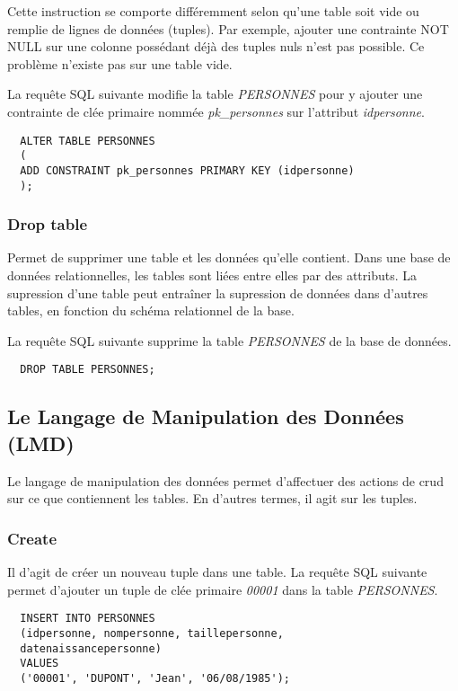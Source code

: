 Cette instruction se comporte différemment selon qu'une table soit vide ou remplie de lignes de données (\glspl{tuple}).
Par exemple, ajouter une contrainte NOT NULL sur une colonne possédant déjà des tuples nuls n'est pas possible. Ce problème n'existe pas sur une table vide.

La requête SQL suivante modifie la table \textit{PERSONNES} pour y ajouter une contrainte de clée primaire nommée \textit{pk\_personnes} sur l'attribut \textit{idpersonne}.

\begin{lstlisting}
  ALTER TABLE PERSONNES
  (
  ADD CONSTRAINT pk_personnes PRIMARY KEY (idpersonne)
  );
\end{lstlisting}

\subsubsection{Drop table}
Permet de supprimer une table et les données qu'elle contient.
Dans une base de données relationnelles, les tables sont liées entre elles par des attributs.
La supression d'une table peut entraîner la supression de données dans d'autres tables, en fonction du schéma relationnel de la base.

La requête SQL suivante supprime la table \textit{PERSONNES} de la base de données.
\begin{lstlisting}
  DROP TABLE PERSONNES;
\end{lstlisting}

\subsection{Le Langage de Manipulation des Données (LMD)}
Le langage de manipulation des données permet d'affectuer des actions de \gls{crud} sur ce que contiennent les tables.
En d'autres termes, il agit sur les tuples.

\subsubsection{Create}
Il d'agit de créer un nouveau tuple dans une table.
La requête SQL suivante permet d'ajouter un tuple de clée primaire \textit{00001} dans la table \textit{PERSONNES}.
\begin{lstlisting}
  INSERT INTO PERSONNES
  (idpersonne, nompersonne, taillepersonne,
  datenaissancepersonne)
  VALUES
  ('00001', 'DUPONT', 'Jean', '06/08/1985');
\end{lstlisting}

